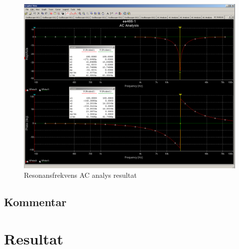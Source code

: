 \documentclass[11pt,a4paper]{article}
\begin{document}
\begin{figure}
    \centering
    \includegraphics[width=1.25\linewidth]{ee466multisim/7-ACanalysis}
    \caption{Resonansfrekvens AC analys resultat}
    \label{fig:7-ACanalysis}
\end{figure}



\subsection{Kommentar}\label{}


\section{Resultat}\label{setup}

\newpage
\end{document}
